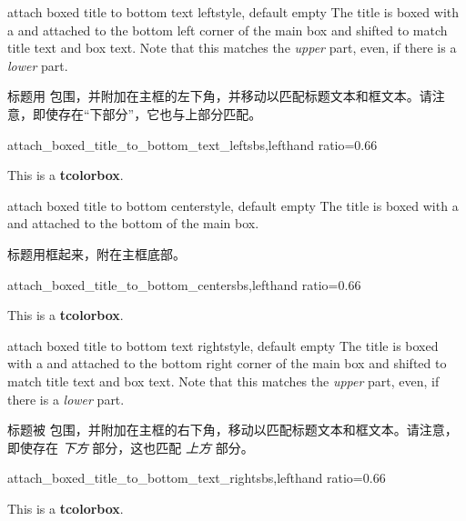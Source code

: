 \begin{docTcbKey}[][doc new=2021-07-30]{attach boxed title to bottom text left}{}{style, default empty}
The title is boxed with a  and attached to
the bottom left corner of the main box
and shifted to match title text and box text.
Note that this matches the \emph{upper} part, even, if there is a \emph{lower} part.

标题用  包围，并附加在主框的左下角，并移动以匹配标题文本和框文本。请注意，即使存在“下部分”，它也与上部分匹配。
\begin{exdispExample*}{attach_boxed_title_to_bottom_text_left}{sbs,lefthand ratio=0.66}
\begin{tcolorbox}[enhanced,title=My title,
  attach boxed title to bottom text left]
  This is a \textbf{tcolorbox}.
\end{tcolorbox}
\end{exdispExample*}
\end{docTcbKey}


\begin{docTcbKey}{attach boxed title to bottom center}{}{style, default empty}
The title is boxed with a  and attached to
the bottom of the main box.

标题用框起来，附在主框底部。
\begin{exdispExample*}{attach_boxed_title_to_bottom_center}{sbs,lefthand ratio=0.66}
\begin{tcolorbox}[enhanced,title=My title,
  attach boxed title to bottom center]
  This is a \textbf{tcolorbox}.
\end{tcolorbox}
\end{exdispExample*}
\end{docTcbKey}


\begin{docTcbKey}[][doc new=2021-07-30]{attach boxed title to bottom text right}{}{style, default empty}
The title is boxed with a  and attached to
the bottom right corner of the main box
and shifted to match title text and box text.
Note that this matches the \emph{upper} part, even, if there is a \emph{lower} part.

标题被  包围，并附加在主框的右下角，移动以匹配标题文本和框文本。请注意，即使存在 \emph{下方} 部分，这也匹配 \emph{上方} 部分。
\begin{exdispExample*}{attach_boxed_title_to_bottom_text_right}{sbs,lefthand ratio=0.66}
\begin{tcolorbox}[enhanced,title=My title,
  halign=right,
  attach boxed title to bottom text right]
  This is a \textbf{tcolorbox}.
\end{tcolorbox}
\end{exdispExample*}
\end{docTcbKey}


